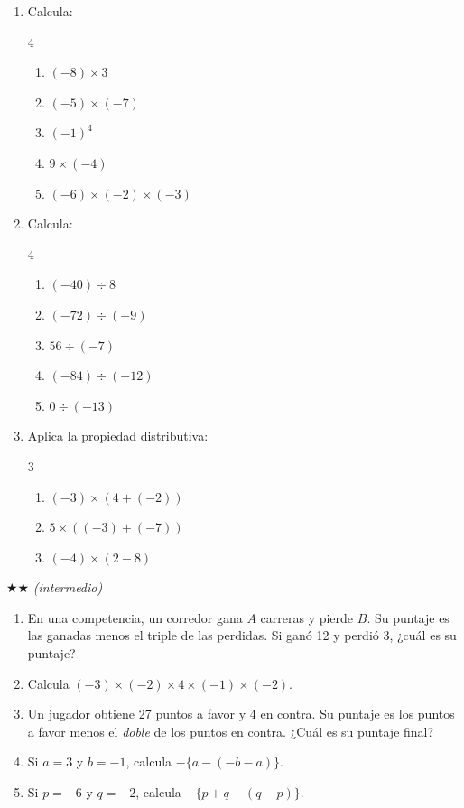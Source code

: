 \documentclass[11pt, letterpaper]{article}
\begin{document}
\begin{enumerate}[label=\textbf{\arabic*.}, leftmargin=*]
  \item Calcula:
  \begin{multicols}{4}
  \begin{enumerate}[label=\alph*)]
    \item $(-8)\times 3$
    \item $(-5)\times(-7)$
    \item $(-1)^4$
    \item $9\times(-4)$
    \item $(-6)\times(-2)\times(-3)$
  \end{enumerate}
  \end{multicols}

  \item Calcula:
  \begin{multicols}{4}
  \begin{enumerate}[label=\alph*)]
    \item $(-40)\div 8$
    \item $(-72)\div(-9)$
    \item $56\div(-7)$
    \item $(-84)\div(-12)$
    \item $0\div(-13)$
  \end{enumerate}
  \end{multicols}

  \item Aplica la propiedad distributiva:
  \begin{multicols}{3}
  \begin{enumerate}[label=\alph*)]
    \item $(-3)\times(4+(-2))$
    \item $5\times((-3)+(-7))$
    \item $(-4)\times(2-8)$
  \end{enumerate}
  \end{multicols}
\end{enumerate}

$\bigstar\bigstar$ \textit{(intermedio)}

\begin{enumerate}[label=\textbf{\arabic*.}, leftmargin=*, resume]
  \item En una competencia, un corredor gana $A$ carreras y pierde $B$. Su puntaje es las ganadas menos el triple de las perdidas. Si gan\'o 12 y perdi\'o 3, ¿cu\'al es su puntaje?

  \item Calcula $(-3)\times(-2)\times 4\times(-1)\times(-2)$.

  \item Un jugador obtiene 27 puntos a favor y 4 en contra. Su puntaje es los puntos a favor menos el \emph{doble} de los puntos en contra. ¿Cu\'al es su puntaje final?

  \item Si $a=3$ y $b=-1$, calcula $-\{a-(-b-a)\}$.

  \item Si $p=-6$ y $q=-2$, calcula $-\{p+q-(q-p)\}$.
\end{enumerate}
\end{document}
